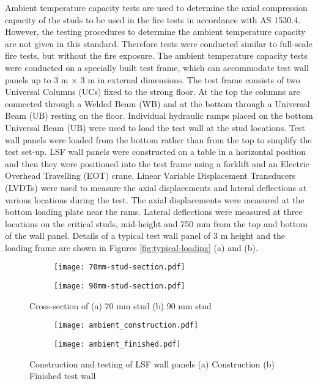 Ambient temperature capacity tests are used to determine the axial compression capacity of the studs to be used in the fire tests in accordance with AS 1530.4. However, the testing procedures to determine the ambient temperature capacity are not given in this standard. Therefore tests were conducted similar to full-scale fire tests, but without the fire exposure. The ambient temperature capacity tests were conducted on a specially built test frame, which can accommodate test wall panels up to 3 m $\times$ 3 m in external dimensions. The test frame consists of two Universal Columns (UCs) fixed to the strong floor. At the top the columns are connected through a Welded Beam (WB) and at the bottom through a Universal Beam (UB) resting on the floor. Individual hydraulic ramps placed on the bottom Universal Beam (UB) were used to load the test wall at the stud locations. Test wall panels were loaded from the bottom rather than from the top to simplify the test set-up. LSF wall panels were constructed on a table in a horizontal position and then they were positioned into the test frame using a forklift and an Electric Overhead Travelling (EOT) crane. Linear Variable Displacement Transducers (LVDTs) were used to measure the axial displacements and lateral deflections at various locations during the test. The axial displacements were measured at the bottom loading plate near the rams. Lateral deflections were measured at three locations on the critical studs, mid-height and 750 mm from the top and bottom of the wall panel. Details of a typical test wall panel of 3 m height and the loading frame are shown in Figures \ref{fig:typical-loading} (a) and (b).
\begin{figure}
	\centering
	\begin{subfigure}[b]{0.3\textwidth}
		\centering
		\texttt{[image: 70mm-stud-section.pdf]}
		\caption{}
		\label{subfig:70mm-section}
	\end{subfigure}
	\begin{subfigure}[b]{0.3\textwidth}
		\centering
		\texttt{[image: 90mm-stud-section.pdf]}
		\caption{}
		\label{subfig:90mm-section}
	\end{subfigure}
	   \caption{Cross-section of (a) 70 mm stud (b) 90 mm stud}
	   \label{fig:stud-cross-section}
\end{figure}
\begin{figure}
	\centering
	\begin{subfigure}[b]{0.75\textwidth}
		\centering
		\texttt{[image: ambient\_construction.pdf]}
		\caption{}
		\label{subfig:ambient_construction}
	\end{subfigure}
	\begin{subfigure}[b]{0.75\textwidth}
		\centering
		\texttt{[image: ambient\_finished.pdf]}
		\caption{}
		\label{subfig:ambient_finished}
	\end{subfigure}
	   \caption{Construction and testing of LSF wall panels (a) Construction (b) Finished test wall}
	   \label{fig:typical-ambient}
\end{figure}
